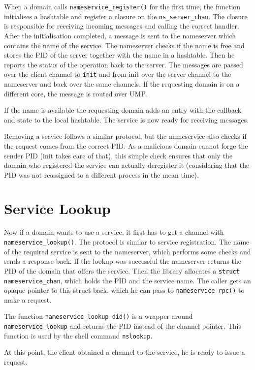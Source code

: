 When a domain calls \verb|nameservice_register()| for the first time, the function initialises a hashtable and register a closure
on the \verb|ns_server_chan|. The closure is responsible for receiving incoming messages and calling the correct handler. After
the initialisation completed, a message is sent to the nameserver which contains the name of the service. The nameserver checks
if the name is free and stores the PID of the server together with the name in a hashtable. Then he reports the status of the 
operation back to the server. The messages are passed over the client channel to \verb|init| and from init over the server channel
to the nameserver and back over the same channels. If the requesting domain is on a different core, the message is routed over UMP.

If the name is available the requesting domain adds an entry with the callback and state to the local hashtable. The service is now
ready for receiving messages.

Removing a service follows a similar protocol, but the nameservice also checks if the request comes from the correct PID. As a malicious
domain cannot forge the sender PID (init takes care of that), this simple check ensures that only the domain who registered the service
can actually deregister it (considering that the PID was not reassigned to a different process in the mean time).

\section{Service Lookup}

Now if a domain wants to use a service, it first has to get a channel with \verb|nameservice_lookup()|. The protocol is similar to
service registration. The name of the required service is sent to the nameserver, which performs some checks and sends a response back.
If the lookup was successful the nameserver returns the PID of the domain that offers the service. Then the library allocates a 
\verb|struct nameservice_chan|, which holds the PID and the service name. The caller gets an opaque pointer to this struct back, which
he can pass to \verb|nameservice_rpc()| to make a request.

The function \verb|nameservice_lookup_did()| is a wrapper around \newline
\verb|nameservice_lookup| and returns the PID instead of the channel pointer.
This function is used by the shell command \verb|nslookup|.

At this point, the client obtained a channel to the service, he is ready to issue a request.

